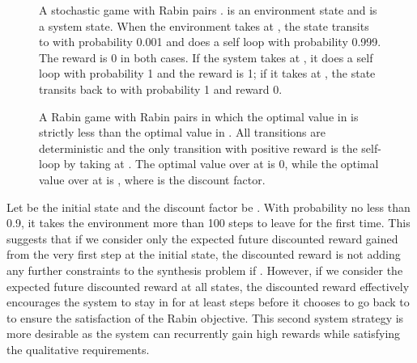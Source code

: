 \documentclass[runningheads,a4paper]{llncs}
\begin{document}
\begin{figure}[t!]
\centering
{}
\caption{A stochastic game with Rabin pairs .  is an environment state and  is a system state. When the environment takes  at , the state transits to  with probability 0.001 and does a self loop with probability 0.999. The reward is 0 in both cases. If the system takes  at , it does a self loop with probability 1 and the reward is 1; if it takes  at , the state transits back to  with probability 1 and reward 0. }
\label{fig:discount}
\endminipage\hfill
{}
\centering
{}
\caption{A Rabin game  with Rabin pairs  in which the optimal value in  is strictly less than the optimal value in . All transitions are deterministic and the only transition with positive reward is the self-loop by taking  at . The optimal value over  at  is 0, while the optimal value over  at  is , where  is the discount factor.}
\label{fig:almostsureoptimal}
\endminipage\hfill
\end{figure}
Let  be the initial state and the discount factor be . With probability no less than 0.9, it takes the environment more than 100 steps to leave  for the first time. This suggests that if we consider only the expected future discounted reward gained from the very first step at the initial state, the discounted reward is not adding any further constraints to the synthesis problem if . However, if we consider the expected future discounted reward at all states, the discounted reward effectively encourages the system to stay in  for at least  steps before it chooses to go back to  to ensure the satisfaction of the Rabin objective. This second system strategy is more desirable as the system can recurrently gain high rewards while satisfying the qualitative requirements. 
\end{document}
